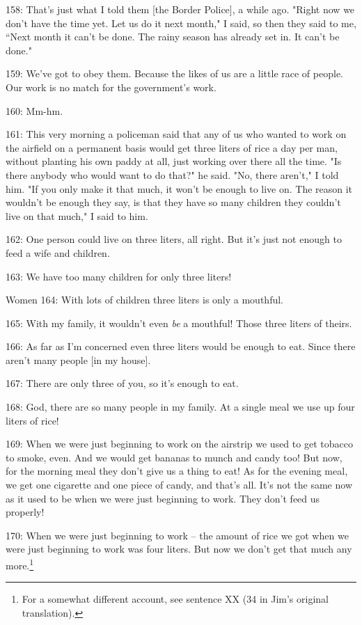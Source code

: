 158: That's just what I told them [the Border Police], a while ago. "Right
now we don't have the time yet. Let us do it next month," I said, so then
they said to me, ``Next month it can't be done. The rainy season has already set
in. It can't be done."

159: We've got to obey them. Because the likes of us are a little race of people.
Our work is no match for the government's work.

160: Mm-hm.

161: This very morning a policeman said that any of us who wanted to work on the
airfield on a permanent basis would get three liters of rice a day per man, without
planting his own paddy at all, just working over there all the time. "Is
there anybody who would want to do that?" he said. "No, there
aren't," I told him. "If you only make it that much, it won't
be enough to live on. The reason it wouldn't be enough they say, is that they have
so many children they couldn't live on that much," I said to him.

162: One person could live on three liters, all right. But it's just not enough
to feed a wife and children.

163: We have too many children for only three liters!

Women 164: With lots of children three liters is only a mouthful.

165: With my family, it wouldn't even \textit{be} a mouthful! Those three liters
of theirs.

166: As far as I'm concerned even three liters would be enough to eat. Since there
aren't many people [in my house].

167: There are only three of you, so it's enough to eat.

168: God, there are so many people in my family. At a single meal we use up four
liters of rice!

169: When we were just beginning to work on the airstrip we used to get tobacco
to smoke, even. And we would get bananas to munch and candy too! But now, for the
morning meal they don't give us a thing to eat! As for the evening meal, we get
one cigarette and one piece of candy, and that's all. It's not the same now as
it used to be when we were just beginning to work. They don't feed us properly!

170: When we were just beginning to work -- the amount of rice we got when we were
just beginning to work was four liters. But now we don't get that much any more.\footnote{For a somewhat different account, see sentence XX (34 in Jim's original translation).}

